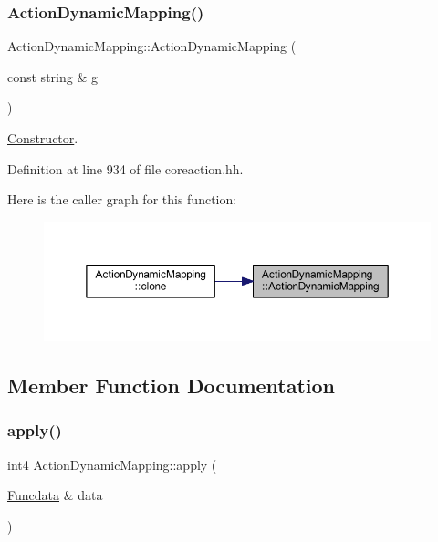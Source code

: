\subsubsection{\texorpdfstring{ActionDynamicMapping()}{ActionDynamicMapping()}}
{\footnotesize\ttfamily Action\+Dynamic\+Mapping\+::\+Action\+Dynamic\+Mapping (\begin{DoxyParamCaption}\item[{const string \&}]{g }\end{DoxyParamCaption})\hspace{0.3cm}{\ttfamily [inline]}}



\mbox{\hyperlink{class_constructor}{Constructor}}. 



Definition at line 934 of file coreaction.\+hh.

Here is the caller graph for this function\+:
\nopagebreak
\begin{figure}[H]
\begin{center}
\leavevmode
\includegraphics[width=350pt]{class_action_dynamic_mapping_a630c7f9adb8e6551f2e1fe1ecaf014a3_icgraph}
\end{center}
\end{figure}


\subsection{Member Function Documentation}
\mbox{\label{class_action_dynamic_mapping_a4d91f3a0cca0be4f2600f5deff083cd8}} 
\subsubsection{\texorpdfstring{apply()}{apply()}}
{\footnotesize\ttfamily int4 Action\+Dynamic\+Mapping\+::apply (\begin{DoxyParamCaption}\item[{\mbox{\hyperlink{class_funcdata}{Funcdata}} \&}]{data }\end{DoxyParamCaption})\hspace{0.3cm}{\ttfamily [virtual]}}



